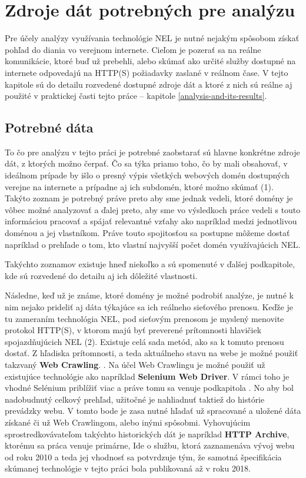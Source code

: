 \chapter{Zdroje dát potrebných pre analýzu}
\label{data-sources-available-for-research}


Pre účely analýzy využívania technológie NEL je nutné nejakým spôsobom získať pohľad do diania vo verejnom internete.
Cieľom je pozerať sa na reálne komunikácie, ktoré buď už prebehli, alebo skúmať ako určité služby dostupné na internete
odpovedajú na HTTP(S) požiadavky zaslané v reálnom čase. V tejto kapitole sú do detailu rozvedené dostupné zdroje dát 
a ktoré z nich sú reálne aj použité v praktickej časti tejto práce -- kapitole \ref{analysis-and-its-results}.

\section{Potrebné dáta}

To čo pre analýzu v tejto práci je potrebné zaobstarať sú hlavne konkrétne zdroje dát, z ktorých možno čerpať. Čo sa týka priamo toho,
čo by mali obsahovať, v ideálnom prípade by išlo o presný výpis všetkých webových domén dostupných verejne na internete 
a prípadne aj ich subdomén, ktoré možno skúmať (1). Takýto zoznam je potrebný práve preto aby sme jednak vedeli, ktoré domény
je vôbec možné analyzovať a ďalej preto, aby sme vo výsledkoch práce vedeli s touto informáciou pracovať a spájať 
relevantné vzťahy ako napríklad medzi jednotlivou doménou a jej vlastníkom. Práve touto spojitosťou sa postupne môžeme dostať napríklad 
o prehľade o tom, kto vlastní najvyšší počet domén využívajúcich NEL. 

Takýchto zoznamov existuje hneď niekoľko a sú spomenuté v ďalšej podkapitole, kde sú rozvedené do detailu aj ich dôležité vlastnosti.

Následne, keď už je známe, ktoré domény je možné podrobiť analýze, je nutné k nim nejako prideliť aj dáta týkajúce sa ich reálneho
sieťového prenosu. Keďže je tu zameraním technológia NEL, pod sieťovým prenosom je myslený menovite protokol HTTP(S), v ktorom
majú byť preverené prítomnosti hlavičiek spojazdňujúcich NEL (2). Existuje 
celá sada metód, ako sa k tomuto prenosu dostať. Z hľadiska prítomnosti, a teda aktuálneho stavu na webe je možné použiť 
takzvaný \textbf{Web Crawling}. . Na účel Web Crawlingu je možné použiť už existujúce technológie 
ako napríklad \textbf{Selenium Web Driver}. V rámci toho je vhodné Selénium priblížiť viac a práve tomu sa venuje podkapitola .
No aby bol nadobudnutý celkový prehľad, užitočné je nahliadnuť taktiež do histórie prevádzky webu. V tomto bode je zasa nutné hľadať už
spracované a uložené dáta získané či už Web Crawlingom, alebo inými spôsobmi. Vyhovujúcim sprostredkovávateľom takýchto historických dát
je napríklad \textbf{HTTP Archive}, ktorému sa práca venuje primárne, Ide o službu, ktorá zaznamenáva vývoj webu od roku 2010 a teda
jej vhodnosť sa potvrdzuje tým, že samotná špecifikácia skúmanej technológie v tejto práci bola publikovaná až v roku 2018.


